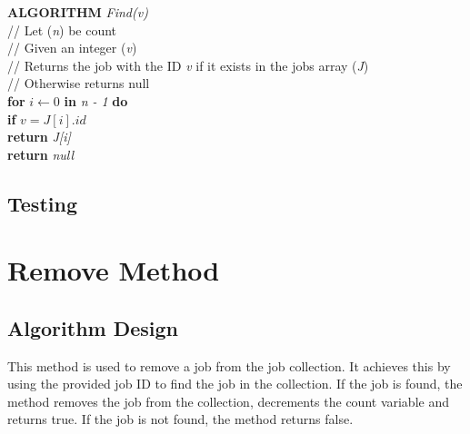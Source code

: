\documentclass[12pt,a4paper]{article}
\begin{document}
			\textbf{ALGORITHM} \textit{Find(v)}\\
			\null\hspace{1cm}// Let (\textit{n}) be count\\
			\null\hspace{1cm}// Given an integer (\textit{v})\\
			\null\hspace{1cm}// Returns the job with the ID \textit{v} if it exists in the jobs array (\textit{J})\\
			\null\hspace{1cm}// Otherwise returns null\\
			\null\hspace{1cm}\textbf{for} \textit{$i \gets 0$} \textbf{in} \textit{n - 1} \textbf{do}\\
			\null\hspace{2cm}\textbf{if} \textit{$v = J[i].id$}\\
			\null\hspace{3cm}\textbf{return} \textit{J[i]}\\
			\null\hspace{1cm}\textbf{return} \textit{null}\\

		\subsection{Testing}

	\section{Remove Method}
		\subsection{Algorithm Design}
			This method is used to remove a job from the job collection. It achieves this by using the 
			provided job ID to find the job in the collection. If the job is found, the method removes the 
			job from the collection, decrements the count variable and returns true. If the job is not found, 
			the method returns false.\\
\end{document}
